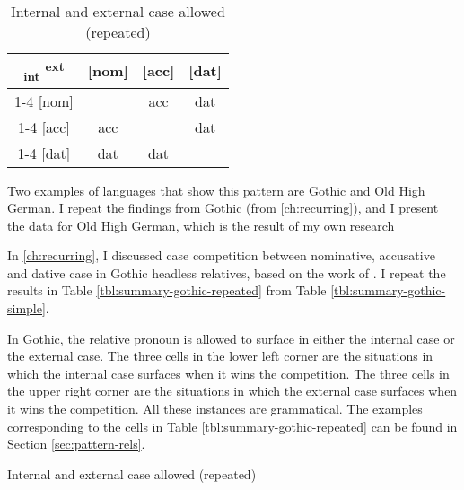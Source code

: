 \begin{table}[H]
  \center
  \caption{Internal and external case allowed (repeated)}
  \begin{tabular}{c|c|c|c}
    \toprule
    \textsubscript{\ac{int}} \textsuperscript{\ac{ext}}
           & [\ac{nom}]
           & [\ac{acc}]
           & [\ac{dat}]
           \\ \cmidrule{1-4}
       [\ac{nom}]
           & \xcancel{\phantom{xx}}
           & \ac{acc}
           & \ac{dat}
           \\ \cmidrule{1-4}
       [\ac{acc}]
           & \ac{acc}
           & \xcancel{\phantom{xx}}
           & \ac{dat}
           \\ \cmidrule{1-4}
       [\ac{dat}]
           & \ac{dat}
           & \ac{dat}
           & \xcancel{\phantom{xx}}
           \\
     \bottomrule
  \end{tabular}
    \label{tbl:case-competition-int-ext-repeated}
\end{table}

Two examples of languages that show this pattern are Gothic and Old High German. I repeat the findings from Gothic (from \ref{ch:recurring}), and I present the data for Old High German, which is the result of my own research

In \ref{ch:recurring}, I discussed case competition between nominative, accusative and dative case in Gothic headless relatives, based on the work of \citet{harbert1978}. I repeat the results in Table \ref{tbl:summary-gothic-repeated} from Table \ref{tbl:summary-gothic-simple}.

In Gothic, the relative pronoun is allowed to surface in either the internal case or the external case. The three cells in the lower left corner are the situations in which the internal case surfaces when it wins the competition. The three cells in the upper right corner are the situations in which the external case surfaces when it wins the competition. All these instances are grammatical. The examples corresponding to the cells in Table \ref{tbl:summary-gothic-repeated} can be found in Section \ref{sec:pattern-rels}.

\begin{table}[H]
  \center
  \caption{Internal and external case allowed (repeated)}
    
    \label{tbl:summary-gothic-repeated}
\end{table}

